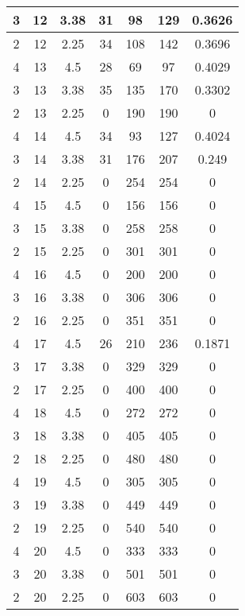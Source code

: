 \documentclass[letterpaper, 12pt]{article}
\begin{document}
\begin{longtable}{|c|c|c|c|c|c|c|}
\hline
3 & 12 & 3.38 & 31 & 98 & 129 & 0.3626 \\
\hline
2 & 12 & 2.25 & 34 & 108 & 142 & 0.3696 \\
\hline
4 & 13 & 4.5 & 28 & 69 & 97 & 0.4029 \\
\hline
3 & 13 & 3.38 & 35 & 135 & 170 & 0.3302 \\
\hline
2 & 13 & 2.25 & 0 & 190 & 190 & 0 \\
\hline
4 & 14 & 4.5 & 34 & 93 & 127 & 0.4024 \\
\hline
3 & 14 & 3.38 & 31 & 176 & 207 & 0.249 \\
\hline
2 & 14 & 2.25 & 0 & 254 & 254 & 0 \\
\hline
4 & 15 & 4.5 & 0 & 156 & 156 & 0 \\
\hline
3 & 15 & 3.38 & 0 & 258 & 258 & 0 \\
\hline
2 & 15 & 2.25 & 0 & 301 & 301 & 0 \\
\hline
4 & 16 & 4.5 & 0 & 200 & 200 & 0 \\
\hline
3 & 16 & 3.38 & 0 & 306 & 306 & 0 \\
\hline
2 & 16 & 2.25 & 0 & 351 & 351 & 0 \\
\hline
4 & 17 & 4.5 & 26 & 210 & 236 & 0.1871 \\
\hline
3 & 17 & 3.38 & 0 & 329 & 329 & 0 \\
\hline
2 & 17 & 2.25 & 0 & 400 & 400 & 0 \\
\hline
4 & 18 & 4.5 & 0 & 272 & 272 & 0 \\
\hline
3 & 18 & 3.38 & 0 & 405 & 405 & 0 \\
\hline
2 & 18 & 2.25 & 0 & 480 & 480 & 0 \\
\hline
4 & 19 & 4.5 & 0 & 305 & 305 & 0 \\
\hline
3 & 19 & 3.38 & 0 & 449 & 449 & 0 \\
\hline
2 & 19 & 2.25 & 0 & 540 & 540 & 0 \\
\hline
4 & 20 & 4.5 & 0 & 333 & 333 & 0 \\
\hline
3 & 20 & 3.38 & 0 & 501 & 501 & 0 \\
\hline
2 & 20 & 2.25 & 0 & 603 & 603 & 0 \\
\hline
\end{longtable}
\end{document}
